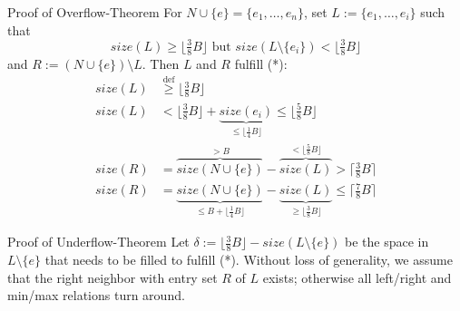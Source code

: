 \documentclass[mathserif]{beamer}
\begin{document}
\begin{frame}[t]{}
\begin{columns}[t]
\begin{column}{.27\linewidth}
    \begin{block}{Proof of Overflow-Theorem}
    For \mbox{$N \cup \{e\} = \{ e_1, \ldots, e_n \}$}, set
    \mbox{$L := \{ e_1, \ldots, e_i \}$} such that
    \[ size(L) \geq \lfloor \tfrac{3}{8} B \rfloor \text{ but }
            size(L \setminus \{e_i\}) < \lfloor \tfrac{3}{8} B \rfloor \]
    and \mbox{$R := (N \cup \{e\}) \setminus L$}.
    Then $L$ and $R$ fulfill (*):
    \begin{align*}
    size(L) &\stackrel{\mathrm{def}}{\geq} \lfloor \tfrac{3}{8} B \rfloor\\
    size(L) &< \lfloor \tfrac{3}{8} B \rfloor
                + \underbrace{size(e_i)}_{\leq \lfloor \frac{1}{4} B \rfloor}
            \leq \lfloor \tfrac{5}{8} B \rfloor\\
    size(R) &= \overbrace{size(N \cup \{e\})}^{> B}
                    - \overbrace{size(L)}^{< \lfloor \frac{5}{8} B \rfloor}
            > \lceil \tfrac{3}{8} B \rceil\\
    size(R) &= \underbrace{size(N \cup \{e\})}_{
                            \leq B + \lfloor \frac{1}{4} B \rfloor}
                    - \underbrace{size(L)}_{\geq \lfloor \frac{3}{8} B \rfloor}
            \leq \lceil \tfrac{7}{8} B \rceil
    \end{align*}
    \end{block}

    \begin{block}{Proof of Underflow-Theorem}
    Let $\delta := \lfloor \tfrac{3}{8} B \rfloor - size(L \setminus \{e\})$
    be the space in \mbox{$L \setminus \{e\}$} that needs to be filled to 
    fulfill (*).
    Without loss of generality, we assume that the right neighbor with entry
    set $R$ of $L$ exists; otherwise all left/right and min/max
    relations turn around.


\end{block}
\end{column}
\end{columns}
\end{frame}
\end{document}
